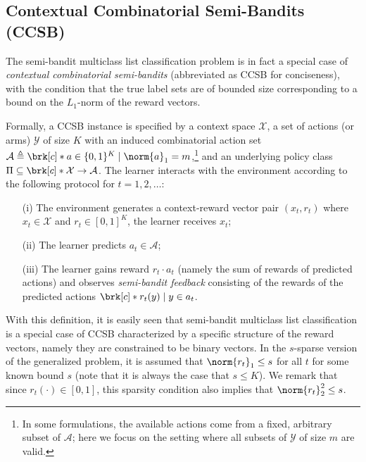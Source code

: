 \documentclass[11pt]{article}
\newcommand{\eqdef}{\triangleq}
\newcommand{\tk}[1]{\textcolor{magenta}{\bf \{TK: #1\}}}
\newcommand{\pred}{a}
\newcommand{\rew}{r}
\newcommand{\lab}{y}
\newcommand{\calX}{\mathcal{X}}
\newcommand{\calY}{\mathcal{Y}}
\newcommand{\calA}{\mathcal{A}}
\theoremstyle{plain}
\begin{document}
\subsection{Contextual Combinatorial Semi-Bandits (CCSB)}
\label{sec:setup-ccsb}

The semi-bandit multiclass list classification problem is in fact a special case of \emph{contextual combinatorial semi-bandits} (abbreviated as CCSB for conciseness), with the condition that the true label sets are of bounded size corresponding to a bound on the $L_1$-norm of the reward vectors. 

Formally, a CCSB instance is specified by a context space $\calX$, a set of actions (or arms) $\calY$ of size $K$ with an induced combinatorial action set $\calA \eqdef \brk[c]*{\pred \in \{ 0,1 \}^K \mid \norm{\pred}_1 = m}$,\footnote{In some formulations, the available actions come from a fixed, arbitrary subset of $\calA$; here we focus on the setting where all subsets of $\calY$ of size $m$ are valid.} and an underlying policy class $\Pi \subseteq \brk[c]*{\calX \to \calA}$. The learner interacts with the environment according to the following protocol for $t=1,2,\ldots$:
% 
\begin{enumerate}[leftmargin=!,itemsep=0pt,parsep=0pt]
    \item[(i)] The environment generates a context-reward vector pair $(x_t, \rew_t)$ where $x_t \in \calX$ and $\rew_t \in [0,1]^K$, the learner receives $x_t$;
    \item[(ii)] The learner predicts $\pred_t \in \calA$;
    \item[(iii)] The learner gains reward $\rew_t \cdot \pred_t$ (namely the sum of rewards of predicted actions) and observes \emph{semi-bandit feedback} consisting of the rewards of the predicted actions $\brk[c]*{\rew_t(\lab) \mid \lab \in \pred_t}$.
\end{enumerate}
% 
With this definition, it is easily seen that semi-bandit multiclass list classification is a special case of CCSB characterized by a specific structure of the reward vectors, namely they are constrained to be binary vectors. In the $s$-sparse version of the generalized problem, it is assumed that $\norm{\rew_t}_1 \leq s$ for all $t$ for some known bound $s$ (note that it is always the case that $s \leq K$). We remark that since $\rew_t(\cdot) \in [0,1]$, this sparsity condition also implies that $\norm{\rew_t}_2^2 \leq s$. 
\end{document}
